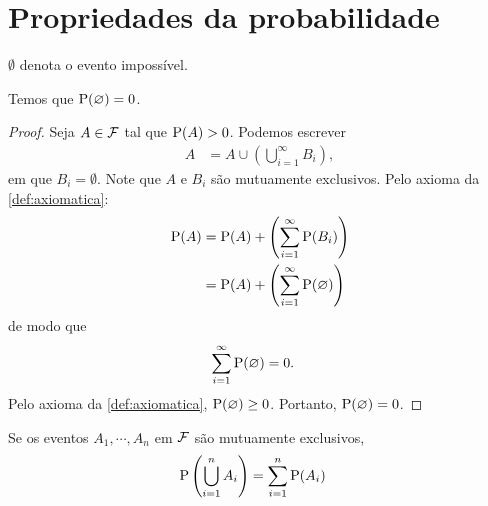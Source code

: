 \section{Propriedades da probabilidade}

\begin{lemma}\label{lem:ch01-vazio}
    $\emptyset$ denota o evento impossível.

    Temos que $\operatorname{P}(\varnothing) = 0$.
\end{lemma}

\begin{proof}
    Seja $A \in \operatorname{\mathcal{F}}$ tal que $\operatorname{P}(A) > 0$. Podemos escrever
    \begin{align*}
        A &= A \cup \left(\bigcup_{i=1}^\infty B_i\right),
    \end{align*}
    em que $B_i = \emptyset$. Note que $A$ e $B_i$ 
    são mutuamente exclusivos. Pelo axioma  
    da \cref{def:axiomatica}:
    \begin{align*}
        \operatorname{P}(A) &= \operatorname{P}(A) +
            \left(\sum_{i=1}^\infty \operatorname{P}(B_i)\right) \\
        &= \operatorname{P}(A) +
            \left(\sum_{i=1}^\infty \operatorname{P}(\varnothing)\right)
    \end{align*}
    de modo que
    \begin{align*}
        \sum_{i=1}^\infty \operatorname{P}(\varnothing) &= 0.
    \end{align*}
    Pelo axioma  
    da \cref{def:axiomatica}, $\operatorname{P}(\varnothing) \geq 0$.
    Portanto, $\operatorname{P}(\varnothing) = 0$.
\end{proof}

\begin{lemma}\label{lem:ch01-uniao-finita}
    Se os eventos $A_1, \cdots, A_n$ em $\operatorname{\mathcal{F}}$ são mutuamente exclusivos,
    \begin{align}
        \operatorname{P}\left(\bigcup_{i=1}^n A_i\right) &=
            \sum_{i=1}^n \operatorname{P}(A_i) \label{eq:ch01-uniao-finita}
    \end{align}
\end{lemma}

